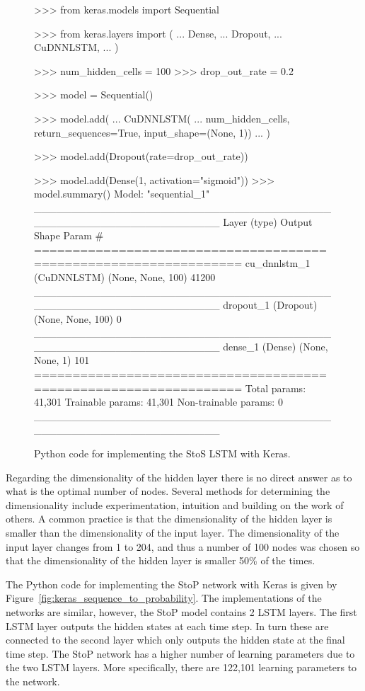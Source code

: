 \begin{figure}[!htbp]
\begin{usagepy}
>>> from keras.models import Sequential

>>> from keras.layers import (
...     Dense,
...     Dropout,
...     CuDNNLSTM,
... )

>>> num_hidden_cells = 100
>>> drop_out_rate = 0.2

>>> model = Sequential()

>>> model.add(
...    CuDNNLSTM(
...        num_hidden_cells, return_sequences=True, input_shape=(None, 1))
... )

>>> model.add(Dropout(rate=drop_out_rate))

>>> model.add(Dense(1, activation="sigmoid"))
>>> model.summary()
Model: "sequential_1"
_________________________________________________________________
Layer (type)                 Output Shape              Param #   
=================================================================
cu_dnnlstm_1 (CuDNNLSTM)     (None, None, 100)         41200     
_________________________________________________________________
dropout_1 (Dropout)          (None, None, 100)         0         
_________________________________________________________________
dense_1 (Dense)              (None, None, 1)           101       
=================================================================
Total params: 41,301
Trainable params: 41,301
Non-trainable params: 0
_________________________________________________________________

\end{usagepy}
\caption{Python code for implementing the StoS LSTM with Keras.}\label{fig:keras_sequence_to_sequence}
\end{figure}

Regarding the dimensionality of the hidden layer there is no direct answer as to
what is the optimal number of nodes. Several methods for determining the
dimensionality include experimentation, intuition and building on the work of
others. A common practice is that the dimensionality of the hidden layer is
smaller than the dimensionality of the input layer. The dimensionality of the
input layer changes from 1 to 204, and thus a number of 100 nodes was chosen
so that the dimensionality of the hidden layer is smaller 50\% of the times.

The Python code for implementing the StoP network with Keras is given by
Figure~\ref{fig:keras_sequence_to_probability}. The implementations of the
networks are similar, however, the StoP model contains 2 LSTM layers. The first
LSTM layer outputs the hidden states at each time step. In turn these are connected to
the second layer which only outputs the hidden state at the final time step. The StoP
network has a higher number of learning parameters due to the two LSTM layers.
More specifically, there are 122,101 learning parameters to the network.

